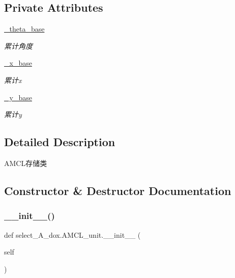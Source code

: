 \subsection*{Private Attributes}
\begin{DoxyCompactItemize}
\item 
\hyperlink{classselect___a__dox_1_1_a_m_c_l__unit_a827a570aad16f5ea7d96c8fcadc7f7f8}{\+\_\+theta\+\_\+base}
\begin{DoxyCompactList}\small\item\em 累计角度 \end{DoxyCompactList}\item 
\hyperlink{classselect___a__dox_1_1_a_m_c_l__unit_a2f9b22e3088f53992c9d407ace117716}{\+\_\+x\+\_\+base}
\begin{DoxyCompactList}\small\item\em 累计x \end{DoxyCompactList}\item 
\hyperlink{classselect___a__dox_1_1_a_m_c_l__unit_a3367abe32dd0b90849e60c51aadd35f8}{\+\_\+y\+\_\+base}
\begin{DoxyCompactList}\small\item\em 累计y \end{DoxyCompactList}\end{DoxyCompactItemize}


\subsection{Detailed Description}
A\+M\+C\+L存储类 



\subsection{Constructor \& Destructor Documentation}
\mbox{\label{classselect___a__dox_1_1_a_m_c_l__unit_a75ef8e5b279e2dde8972ba0a09cd2ff5}} 
\subsubsection{\texorpdfstring{\+\_\+\+\_\+init\+\_\+\+\_\+()}{\_\_init\_\_()}}
{\footnotesize\ttfamily def select\+\_\+\+A\+\_\+dox.\+A\+M\+C\+L\+\_\+unit.\+\_\+\+\_\+init\+\_\+\+\_\+ (\begin{DoxyParamCaption}\item[{}]{self }\end{DoxyParamCaption})}




